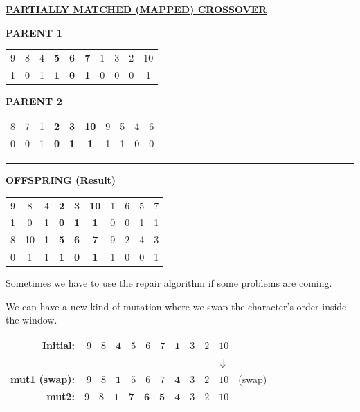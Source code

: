 \begin{center}
    \underline{\Large \textbf{PARTIALLY MATCHED (MAPPED) CROSSOVER}}
\end{center}

\vspace{1em}

\textbf{PARENT 1} \\
\begin{tabular}{ccc|ccc|cccc}
    9 & 8 & 4 & \textbf{5} & \textbf{6} & \textbf{7} & 1 & 3 & 2 & 10 \\
    1 & 0 & 1 & \textbf{1} & \textbf{0} & \textbf{1} & 0 & 0 & 0 & 1 \\
\end{tabular}

\vspace{1em}

\textbf{PARENT 2} \\
\begin{tabular}{ccc|ccc|cccc}
    8 & 7 & 1 & \textbf{2} & \textbf{3} & \textbf{10} & 9 & 5 & 4 & 6 \\
    0 & 0 & 1 & \textbf{0} & \textbf{1} & \textbf{1} & 1 & 1 & 0 & 0 \\
\end{tabular}

\vspace{1em}
\hrule
\vspace{1em}

\textbf{OFFSPRING (Result)} \\
\begin{tabular}{ccc|ccc|cccc}
    9 & 8 & 4 & \textbf{2} & \textbf{3} & \textbf{10} & 1 & 6 & 5 & 7 \\
    1 & 0 & 1 & \textbf{0} & \textbf{1} & \textbf{1} & 0 & 0 & 1 & 1 \\
    \hline
    8 & 10 & 1 & \textbf{5} & \textbf{6} & \textbf{7} & 9 & 2 & 4 & 3 \\
    0 & 1 & 1 & \textbf{1} & \textbf{0} & \textbf{1} & 1 & 0 & 0 & 1 \\
\end{tabular}

\vspace{1em}

Sometimes we have to use the repair algorithm if some problems are coming.

We can have a new kind of mutation where we swap the character's order inside the window. 

\begin{center}
\begin{tabular}{rrc}
    \textbf{Initial:} & $9 \quad 8 \quad \underline{\mathbf{4} \quad 5 \quad 6 \quad 7 \quad \mathbf{1}} \quad 3 \quad 2 \quad 10$ & \\[0.8em]
    & $\Downarrow$ & \\[0.8em]
    \textbf{mut1 (swap):} & $9 \quad 8 \quad \mathbf{1} \quad 5 \quad 6 \quad 7 \quad \mathbf{4} \quad 3 \quad 2 \quad 10$ & (swap) \\
    \textbf{mut2:} & $9 \quad 8 \quad \mathbf{1} \quad \mathbf{7} \quad \mathbf{6} \quad \mathbf{5} \quad \mathbf{4} \quad 3 \quad 2 \quad 10$ & 
\end{tabular}
\end{center}

